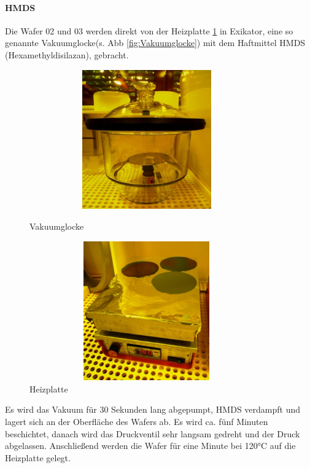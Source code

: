 \paragraph[HMDS ]{HMDS}

Die Wafer 02 und 03 werden direkt von der Heizplatte \ref{fig:Heizplatte} in Exikator, eine so
genannte Vakuumglocke(s. Abb \ref{fig:Vakuumglocke}) mit dem  Haftmittel HMDS (Hexamethyldisilazan), gebracht.


\begin{figure}[H]
\centering
\begin{minipage}[hbt]{6cm}
    \centering
    \includegraphics[width=0.9\textwidth, height=6cm]{bilder/Vakuumglocke.png}
  \caption{Vakuumglocke}
  \label{fig:Vakuumglocke}
\end{minipage}
\begin{minipage}[hbt]{6cm}
    \centering
    \includegraphics[width=0.9\textwidth,height=6cm]{bilder/Heizplatte.png}
  \caption{Heizplatte}
  \label{fig:Heizplatte}
\end{minipage}

\end{figure}



Es wird das Vakuum für 30 Sekunden lang abgepumpt, HMDS verdampft und lagert sich an der Oberfläche des Wafers ab. Es wird ca. fünf Minuten beschichtet, danach wird das Druckventil sehr langsam gedreht und der Druck abgelassen. Anschließend werden die Wafer für eine Minute bei 120°C auf die Heizplatte gelegt.




